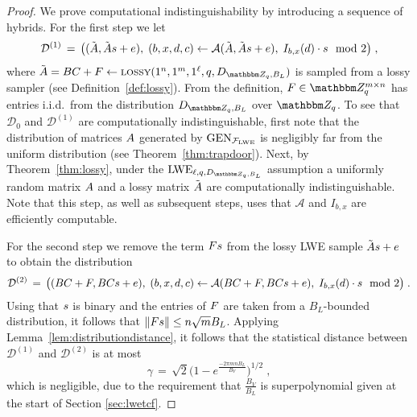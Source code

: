 \begin{proof}
We prove computational indistinguishability by introducing a sequence of hybrids. For the first step we let 
\begin{eqnarray}\label{eq:initialtolossy}
\mathcal{D}^{(1)} \,=\, \big((\tilde{\*A}, \tilde{\*A}\*s + \*e),\; (b,x,d,c)\leftarrow \mathcal{A}(\tilde{\*A},\tilde{\*A}\*s + \*e),\; I_{b,x}(d)\cdot s \mod 2\big)\;,
\end{eqnarray}
where $\tilde{\*A} = \*B\*C + \*F \leftarrow \lossy(1^n,1^m,1^\ell,q,D_{\mZ_q,B_L})$ is sampled from a lossy sampler (see Definition~\ref{def:lossy}). From the definition, $\*F\in \mZ_q^{m\times n}$ has entries i.i.d.\ from the distribution $D_{\mZ_q,B_L}$ over $\mZ_q$. To see that $\mathcal{D}_{0}$ and $\mathcal{D}^{(1)}$ are computationally indistinguishable, first note that the distribution of matrices $\*A$ generated by $\textrm{GEN}_{\mathcal{F}_{\mathrm{LWE}}}$ is negligibly far from the uniform distribution (see Theorem~\ref{thm:trapdoor}). Next, by Theorem~\ref{thm:lossy}, under the $\lwe_{\ell,q,D_{\mZ_q,B_L}}$ assumption a uniformly random matrix $\*A$ and a lossy matrix $\tilde{\*A}$ are computationally indistinguishable. Note that this step, as well as subsequent steps, uses that $\mathcal{A}$ and $I_{b,x}$ are efficiently computable. 

For the second step we remove the term $\*F\*s$ from the lossy LWE sample $\tilde{\*A}\*s + \*e$ to obtain the distribution
\begin{eqnarray}\label{eq:lossystatdistance}
\mathcal{D}^{(2)} \,=\, \big( (\*B\*C+\*F, \*B\*C\*s + \*e),\; (b,x,d,c)\leftarrow \mathcal{A}(\*B\*C + \*F,\*B\*C\*s + \*e),\; I_{b,x}(d) \cdot s\mod 2\big) \;.
\end{eqnarray}
Using that $\*s$ is binary and the entries of $\*F$ are taken from a $B_L$-bounded distribution, it follows that $\|\*F\*s\|\leq n\sqrt{m}B_L$. Applying Lemma~\ref{lem:distributiondistance}, it follows that the statistical distance between $\mathcal{D}^{(1)}$ and $\mathcal{D}^{(2)}$ is at most 
\begin{equation}\label{eq:def-gamma}
\gamma \,=\, \sqrt{2}\Big(1 - e^{\frac{-2\pi mnB_L}{B_V}}\Big)^{1/2}\;,
\end{equation}
which is negligible, due to the requirement that $\frac{B_V}{B_L}$ is superpolynomial given at the start of Section \ref{sec:lwetcf}.


\end{proof}
